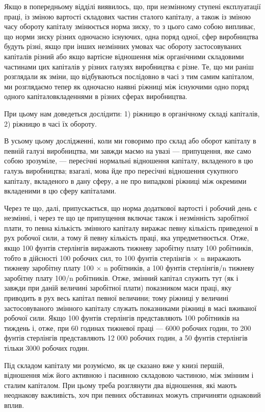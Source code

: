 Якщо в попередньому відділі виявилось, що, при незмінному
ступені експлуатації праці, із зміною вартості складових частин
сталого капіталу, а також із зміною часу обороту капіталу змінюється
норма зиску, то з цього само собою випливає, що
норми зиску різних одночасно існуючих, одна поряд одної, сфер
виробництва будуть різні, якщо при інших незмінних умовах
час обороту застосовуваних капіталів різний або якщо вартісне
відношення між органічними складовими частинами цих капіталів
у різних галузях виробництва є різне. Те, що ми раніш
розглядали як зміни, що відбуваються послідовно в часі
з тим самим капіталом, ми розглядаємо тепер як одночасно
наявні ріжниці між існуючими одно поряд одного капіталовкладеннями
в різних сферах виробництва.

При цьому нам доведеться дослідити: 1) ріжницю в органічному
складі капіталів, 2) ріжницю в часі їх обороту.

В усьому цьому дослідженні, коли ми говоримо про склад
або оборот капіталу в певній галузі виробництва, ми завжди
маємо на увазі — припущення, яке само собою зрозуміле, — пересічні
нормальні відношення капіталу, вкладеного в цю галузь
виробництва; взагалі, мова йде про пересічні відношення сукупного
капіталу, вкладеного в дану сферу, а не про випадкові
ріжниці між окремими вкладеними в цю сферу капіталами.

Через те що, далі, припускається, що норма додаткової вартості
і робочий день є незмінні, і через те що це припущення
включає також і незмінність заробітної плати, то певна кількість
змінного капіталу виражає певну кількість приведеної
в рух робочої сили, а тому й певну кількість праці, яка упредметнюється.
Отже, якщо 100 фунтів стерлінгів виражають тижневу
заробітну плату 100 робітників, тобто в дійсності 100 робочих
сил, то 100 фунтів стерлінгів × n виражають тижневу
заробітну плату 100 × n робітників, а 100 фунтів стерлінгів/n тижневу
заробітну плату 100/n робітників. Отже, змінний капітал служить
тут (як і завжди при даній величині заробітної плати) показником
маси праці, яку приводить в рух весь капітал певної величини;
тому ріжниці у величині застосовуваного змінного капіталу
служать показниками ріжниці в масі вживаної робочої сили. Якщо
100 фунтів стерлінгів представляють 100 робітників на тиждень
і, отже, при 60 годинах тижневої праці — 6000 робочих годин, то
200 фунтів стерлінгів представляють 12 000 робочих годин, а 50
фунтів стерлінгів тільки 3000 робочих годин.

Під складом капіталу ми розуміємо, як це сказано вже у
книзі першій, відношення між його активною і пасивною складовою
частиною, між змінним і сталим капіталом. При цьому
треба розглянути два відношення, які мають неоднакову важливість,
хоч при певних обставинах можуть спричиняти однаковий
вплив.

